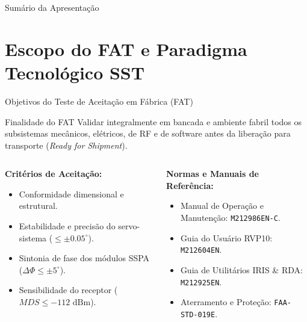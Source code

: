 ﻿\documentclass[aspectratio=169]{beamer}
\begin{document}
\begin{frame}{Sum{\'a}rio da Apresenta{\c{c}}{\~a}o}
    \tableofcontents
\end{frame}

\section{Escopo do FAT e Paradigma Tecnol{\'o}gico SST}

\begin{frame}{Objetivos do Teste de Aceita{\c{c}}{\~a}o em F{\'a}brica (FAT)}
    \begin{block}{Finalidade do FAT}
        Validar integralmente em bancada e ambiente fabril todos os subsistemas mec{\^a}nicos, el{\'e}tricos, de RF e de software antes da libera{\c{c}}{\~a}o para transporte (\textit{Ready for Shipment}).
    \end{block}

    \vspace{0.2cm}
    \begin{columns}[T]
        \begin{column}{0.48\textwidth}
            \textbf{Crit{\'e}rios de Aceita{\c{c}}{\~a}o:}
            \begin{itemize}
                \item Conformidade dimensional e estrutural.
                \item Estabilidade e precis{\~a}o do servo-sistema ($\le \pm 0.05^\circ$).
                \item Sintonia de fase dos m{\'o}dulos SSPA ($\Delta\Phi \le \pm 5^\circ$).
                \item Sensibilidade do receptor ($MDS \le -112\text{ dBm}$).
            \end{itemize}
        \end{column}
        \begin{column}{0.48\textwidth}
            \textbf{Normas e Manuais de Refer{\^e}ncia:}
            \begin{itemize}
                \item Manual de Opera{\c{c}}{\~a}o e Manuten{\c{c}}{\~a}o: \texttt{M212986EN-C}.
                \item Guia do Usu{\'a}rio RVP10: \texttt{M212604EN}.
                \item Guia de Utilit{\'a}rios IRIS \& RDA: \texttt{M212925EN}.
                \item Aterramento e Prote{\c{c}}{\~a}o: \texttt{FAA-STD-019E}.
            \end{itemize}
        \end{column}
    \end{columns}
\end{frame}
\end{document}
